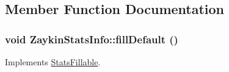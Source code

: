 \subsection{Member Function Documentation}
\hypertarget{classZaykinStatsInfo_ac10ab8cf255d518161ce459ebcfdc8a4}{
\subsubsection[{fillDefault}]{\setlength{\rightskip}{0pt plus 5cm}void ZaykinStatsInfo::fillDefault ()}}
\label{classZaykinStatsInfo_ac10ab8cf255d518161ce459ebcfdc8a4}


Implements \hyperlink{classStatsFillable_a6bc1a66ea949a078faa1b9ccdac54aba}{StatsFillable}.




